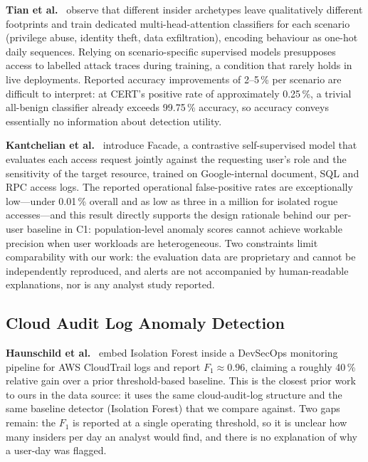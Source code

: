 \textbf{Tian et al.}~\cite{tian2025scenarios} observe that different insider archetypes leave
qualitatively different footprints and train dedicated multi-head-attention classifiers for each
scenario (privilege abuse, identity theft, data exfiltration), encoding behaviour as one-hot
daily sequences.
Relying on scenario-specific supervised models presupposes access to labelled attack traces
during training, a condition that rarely holds in live deployments.
Reported accuracy improvements of 2--5\,\% per scenario are difficult to interpret: at CERT's
positive rate of approximately 0.25\,\%, a trivial all-benign classifier already exceeds
99.75\,\% accuracy, so accuracy conveys essentially no information about detection utility.

\textbf{Kantchelian et al.}~\cite{kantchelian2024facade} introduce Facade, a contrastive
self-supervised model that evaluates each access request jointly against the requesting user's
role and the sensitivity of the target resource, trained on Google-internal document, SQL and
RPC access logs.
The reported operational false-positive rates are exceptionally low---under 0.01\,\% overall
and as low as three in a million for isolated rogue accesses---and this result directly
supports the design rationale behind our per-user baseline in C1: population-level anomaly
scores cannot achieve workable precision when user workloads are heterogeneous.
Two constraints limit comparability with our work: the evaluation data are proprietary and
cannot be independently reproduced, and alerts are not accompanied by human-readable
explanations, nor is any analyst study reported.

\subsection{Cloud Audit Log Anomaly Detection}

\textbf{Haunschild et al.}~\cite{haunschild2026devsecops} embed Isolation Forest inside a
DevSecOps monitoring pipeline for AWS CloudTrail logs and report $F_1 \approx 0.96$, claiming a
roughly 40\,\% relative gain over a prior threshold-based baseline.
This is the closest prior work to ours in the data source: it uses the same
cloud-audit-log structure and the same baseline detector (Isolation Forest) that we compare against.
Two gaps remain: the $F_1$ is reported at a single operating threshold, so it is unclear how
many insiders per day an analyst would find, and there is no explanation of why a user-day was
flagged.

